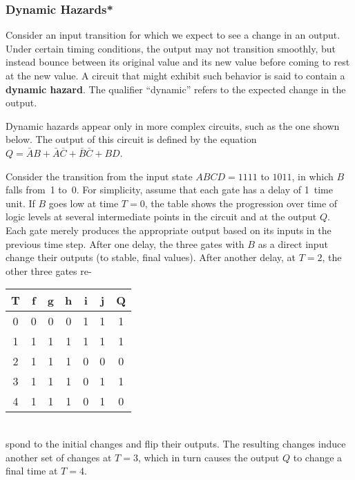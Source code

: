 \subsubsection{Dynamic Hazards*}

Consider an input transition for which we expect to see a change in an
output.  Under certain timing conditions, the output may not
transition smoothly, but instead bounce between its original value
and its new value before coming to rest at the new value.  A circuit
that might exhibit such behavior is said to contain a {\bf dynamic hazard}.
The qualifier ``dynamic'' refers to the expected change in the output.

Dynamic hazards appear only in more complex circuits, such as the one
shown below.  The output of this circuit is defined by the equation $Q=\bar{A}B+\bar{A}\bar{C}+\bar{B}\bar{C}+BD$.\vspace{30pt} 

\centerline{}\vspace{30pt}

\begin{minipage}{4.5in}
Consider the transition from the input state $ABCD=1111$ to $1011$,
in which $B$ falls from~1 to~0.  For simplicity, assume that each
gate has a delay of 1~time unit.  If $B$ goes low at time $T=0$, the
table shows the progression over time of logic levels at several
intermediate points in the circuit and at the output $Q$.  Each gate
merely produces the appropriate output based on its inputs in the
previous time step.  After one delay, the three gates with $B$ as a
direct input change their outputs (to stable, final values).  After
another delay, at $T=2$, the other three gates
re-\linebreak\vspace{-8pt}
\end{minipage}\hfill%
\begin{minipage}{1.75in}
\begin{tabular}{|c|c|c|c|c|c|c|}\hline
T&f&g&h&i&j&Q\\ \hline
0& 0& 0& 0& 1& 1& 1\\
1& 1& 1& 1& 1& 1& 1\\
2& 1& 1& 1& 0& 0& 0\\
3& 1& 1& 1& 0& 1& 1\\
4& 1& 1& 1& 0& 1& 0\\\hline
\end{tabular}
\end{minipage}\\
spond to the initial changes and flip their outputs.  The resulting
changes induce another set of changes at $T=3$, which in turn causes
the output $Q$ to change a final time at $T=4$.

